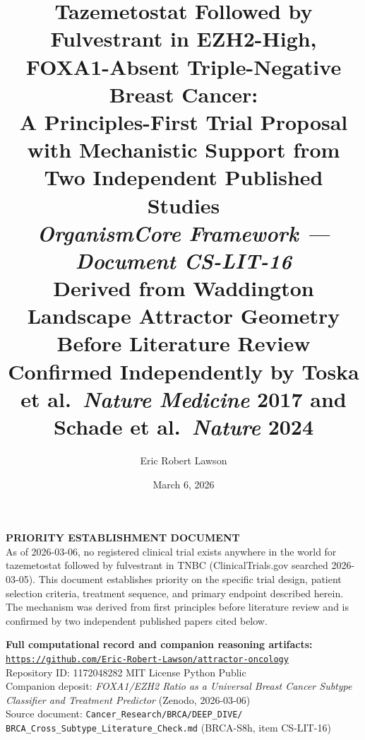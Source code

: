 \documentclass[12pt, a4paper]{article}
\title{
    \vspace{-1em}
    \textbf{Tazemetostat Followed by Fulvestrant in
    EZH2-High, FOXA1-Absent Triple-Negative Breast
    Cancer:}\\[0.5em]
    \large A Principles-First Trial Proposal with
    Mechanistic Support from Two Independent
    Published Studies\\[0.4em]
    \normalsize \textit{OrganismCore Framework ---
    Document CS-LIT-16}\\[0.3em]
    \small Derived from Waddington Landscape Attractor
    Geometry Before Literature Review\\[0.3em]
    \small Confirmed Independently by Toska et al.\
    \textit{Nature Medicine} 2017 and
    Schade et al.\ \textit{Nature} 2024
}
\author[1]{Eric Robert Lawson}
\affil[1]{
    OrganismCore\\
    \href{mailto:OrganismCore@proton.me}
         {OrganismCore@proton.me}\\
    ORCID:
    \href{https://orcid.org/0009-0002-0414-6544}
         {0009-0002-0414-6544}
}
\date{March 6, 2026}
\begin{document}

\maketitle
\thispagestyle{fancy}

\begin{center}
\colorbox{urgentbox}{
\begin{minipage}{0.88\textwidth}
\vspace{0.5em}
\centering
\textbf{PRIORITY ESTABLISHMENT DOCUMENT}\\[0.3em]
\small
As of 2026-03-06, no registered clinical trial
exists anywhere in the world for tazemetostat
followed by fulvestrant in TNBC
(ClinicalTrials.gov searched 2026-03-05).
This document establishes priority on the specific
trial design, patient selection criteria, treatment
sequence, and primary endpoint described herein.
The mechanism was derived from first principles
before literature review and is confirmed by two
independent published papers cited below.
\vspace{0.5em}
\end{minipage}
}
\end{center}

\vspace{0.6em}

\begin{center}
\colorbox{repobox}{
\begin{minipage}{0.88\textwidth}
\vspace{0.4em}
\centering
\textbf{Full computational record and companion
reasoning artifacts:}\\[0.3em]
\href{https://github.com/Eric-Robert-Lawson/attractor-oncology}
{\texttt{https://github.com/Eric-Robert-Lawson/attractor-oncology}}
\\[0.2em]
\small
Repository ID: 1172048282 \textbar{}
MIT License \textbar{}
Python \textbar{}
Public\\[0.2em]
Companion deposit:
\textit{FOXA1/EZH2 Ratio as a Universal Breast Cancer
Subtype Classifier and Treatment Predictor}
(Zenodo, 2026-03-06)\\[0.2em]
Source document: \texttt{Cancer\_Research/BRCA/DEEP\_DIVE/}
\texttt{BRCA\_Cross\_Subtype\_Literature\_Check.md}
(BRCA-S8h, item CS-LIT-16)
\vspace{0.4em}
\end{minipage}
}
\end{center}
\end{document}
